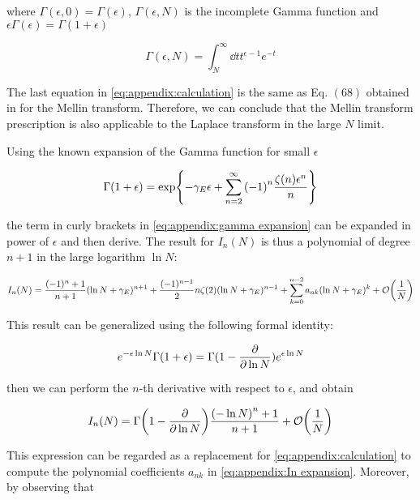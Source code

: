 \documentclass[../main.tex]{subfiles}
\begin{document}
where $\Gamma(\epsilon,0) = \Gamma(\epsilon)$, $\Gamma(\epsilon,N)$ is the incomplete Gamma function and $\epsilon \Gamma(\epsilon)=\Gamma(1+\epsilon)$

\begin{equation}
    \Gamma(\epsilon,N) = \int_N^\infty \dd{t} t^{\epsilon-1} e^{-t}
\end{equation}

The last equation in \cref{eq:appendix:calculation} is the same as Eq. $(68)$ obtained in \cite{Catani_2003_appendix} for the Mellin transform. Therefore, 
we can conclude that the Mellin transform prescription is also applicable to the Laplace transform in the large $N$ limit.

Using the known expansion of the Gamma function for small $\epsilon$ 

\begin{equation}\label{eq:appendix:gamma expansion}
    \Gamma(1+\epsilon) = \exp{-\gamma_E \epsilon + \sum_{n=2}^\infty \qty(-1)^n \frac{\zeta(n) \epsilon^n}{n}}
\end{equation}

the term in curly brackets in \cref{eq:appendix:gamma expansion} can be expanded in power of $\epsilon$ and then derive. The result for $I_n(N)$ is thus a 
polynomial of degree $n+1$ in the large logarithm $\ln N$:

\begin{equation}\label{eq:appendix:In expansion}
    I_n(N) = \frac{(-1)^n+1}{n+1} (\ln N + \gamma_E)^{n+1} + \frac{(-1)^{n-1}}{2} n \zeta(2) (\ln N + \gamma_E)^{n-1} + \sum_{k=0}^{n-2} a_{nk} (\ln N + \gamma_E)^k +\order{\frac{1}{N}}
\end{equation}

This result can be generalized using the following formal identity:

\begin{equation}
    e^{-\epsilon \ln N} \Gamma(1+\epsilon) = \Gamma(1- \pdv{\ln N}) e^{\epsilon \ln N }
\end{equation}

then we can perform the $n$-th derivative with respect to $\epsilon$, and obtain

\begin{equation}
    I_n(N) = \Gamma\qty(1-\pdv{\ln N}) \frac{ \qty(-\ln N)^n+1}{n+1} + \order{\frac{1}{N}}
\end{equation}

This expression can be regarded as a replacement for \cref{eq:appendix:calculation} to compute the polynomial coefficients $a_{nk}$ 
in \cref{eq:appendix:In expansion}. Moreover, by observing that 
\end{document}
